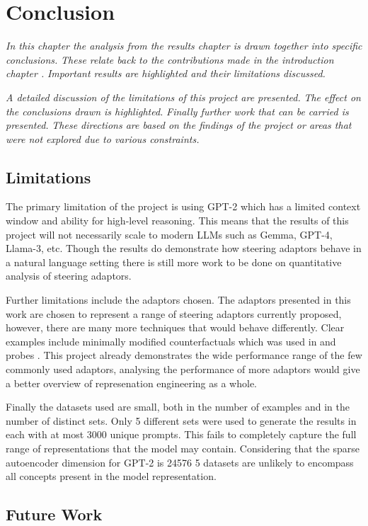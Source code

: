 \chapter{Conclusion}
\label{ch:conclusion}

\emph{In this chapter the analysis from the results chapter  is drawn together into specific conclusions.}
\emph{These relate back to the contributions made in the introduction chapter .}
\emph{Important results are highlighted and their limitations discussed.}

\emph{A detailed discussion of the limitations of this project are presented.}
\emph{The effect on the conclusions drawn is highlighted.}
\emph{Finally further work that can be carried is presented.}
\emph{These directions are based on the findings of the project or areas that were not explored due to various constraints.}

\section{Limitations}

The primary limitation of the project is using GPT-2 which has a limited context window and ability for high-level reasoning.
This means that the results of this project will not necessarily scale to modern LLMs such as Gemma, GPT-4, Llama-3, etc.
Though the results do demonstrate how steering adaptors behave in a natural language setting there is still more work to be done on quantitative analysis of steering adaptors.

Further limitations include the adaptors chosen.
The adaptors presented in this work are chosen to represent a range of steering adaptors currently proposed, however, there are many more techniques that would behave differently.
Clear examples include minimally modified counterfactuals \citep{mimic} which was used in \citet{steering-clear} and probes \citep{probes}.
This project already demonstrates the wide performance range of the few commonly used adaptors, analysing the performance of more adaptors would give a better overview of represenation engineering as a whole.

Finally the datasets used are small, both in the number of examples and in the number of distinct sets.
Only 5 different sets were used to generate the results in  each with at most 3000 unique prompts.
This fails to completely capture the full range of representations that the model may contain.
Considering that the sparse autoencoder dimension for GPT-2 is 24576 \citep{saelens} 5 datasets are unlikely to encompass all concepts present in the model representation.

\section{Future Work}
